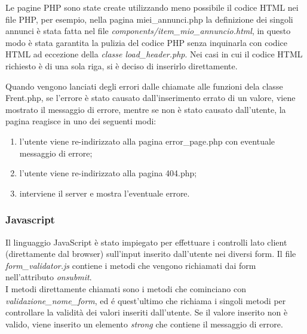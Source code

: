 \documentclass[1_relazione.tex]{subfiles}
\begin{document}
Le pagine PHP sono state create utilizzando meno possibile il codice HTML nei file PHP, per esempio, nella pagina miei_annunci.php la definizione dei singoli annunci \`{e} stata fatta nel file \textit{components/item_mio_annuncio.html}, in questo modo \`{e} stata garantita la pulizia del codice PHP senza inquinarla con codice HTML ad eccezione della \textit{classe load_header.php}. Nei casi in cui il codice HTML richiesto \`{e} di una sola riga, si \`{e} deciso di inserirlo direttamente.

Quando vengono lanciati degli errori dalle chiamate alle funzioni dela classe Frent.php, se l'errore \`{e} stato causato dall'inserimento errato di un valore, viene mostrato il messaggio di errore, mentre se non \`{e} stato causato dall'utente, la pagina reagisce in uno dei seguenti modi:
\begin{enumerate}
    \item l'utente viene re-indirizzato alla pagina error_page.php con eventuale messaggio di errore;
    \item l'utente viene re-indirizzato alla pagina 404.php;
    \item interviene il server e mostra l'eventuale errore.
\end{enumerate}

\subsubsection{Javascript}
Il linguaggio JavaScript è stato impiegato per effettuare i controlli lato client (direttamente dal browser) sull'input inserito dall'utente nei diversi form.
Il file \textit{form_validator.js} contiene i metodi che vengono richiamati dai form nell'attributo \textit{onsubmit}.\\
    I metodi direttamente chiamati sono i metodi che cominciano con \textit{validazione_nome_form}, ed \'{e} quest'ultimo che richiama i singoli metodi per controllare la validit\`{a} dei valori inseriti dall'utente.
    Se il valore inserito non \`{e} valido, viene inserito un elemento \textit{strong} che contiene il messaggio di errore. 
\end{document}
